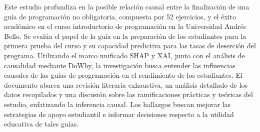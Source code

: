\fontsize{12}{14}\selectfont
Este estudio profundiza en la posible relación causal entre la finalización de una guía de programación no obligatoria, compuesta por 52 ejercicios, y el éxito académico en el curso introductorio de programación en la Universidad Andrés Bello. Se evalúa el papel de la guía en la preparación de los estudiantes para la primera prueba del curso y su capacidad predictiva para las tasas de deserción del programa. Utilizando el marco unificado SHAP y XAI, junto con el análisis de causalidad mediante DoWhy, la investigación busca entender las influencias causales de las guías de programación en el rendimiento de los estudiantes. El documento abarca una revisión literaria exhaustiva, un análisis detallado de los datos recopilados y una discusión sobre las ramificaciones prácticas y teóricas del estudio, enfatizando la inferencia causal. Los hallazgos buscan mejorar las estrategias de apoyo estudiantil e informar decisiones respecto a la utilidad educativa de tales guías.
